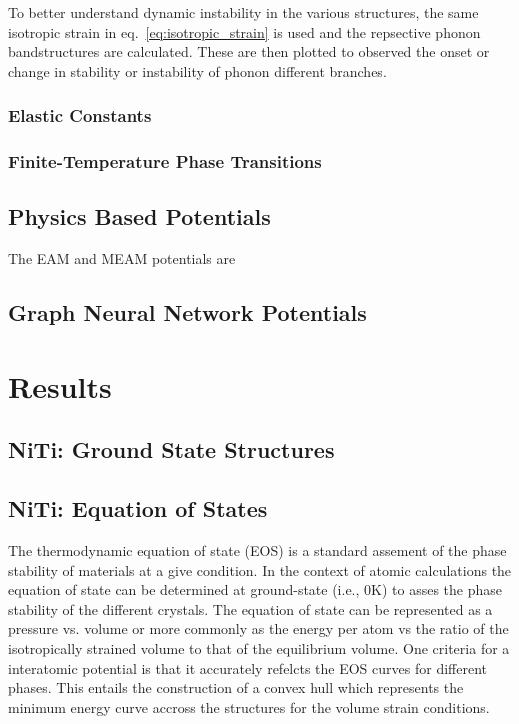 \documentclass[preprint]{elsarticle}
\begin{document}
To better understand dynamic instability in the various structures, the same isotropic strain in eq.~\ref{eq:isotropic_strain} is used and the repsective phonon bandstructures are calculated. These are then plotted to observed the onset or change in stability or instability of phonon different branches. \par

\subsubsection{Elastic Constants}


\subsubsection{Finite-Temperature Phase Transitions}

\subsection{Physics Based Potentials}
\label{sec:physics_potentials}

The EAM and MEAM potentials are 


\subsection{Graph Neural Network Potentials}



\section{Results}
\label{sec:results}

\subsection{NiTi: Ground State Structures}
\label{subsec:nitigs}



\subsection{NiTi: Equation of States}
\label{subsec:nitieos}

The thermodynamic equation of state (EOS) is a standard assement of the phase stability of materials at a give condition. In the context of atomic calculations the equation of state can be determined at ground-state (i.e., 0K) to asses the phase stability of the different crystals. The equation of state can be represented as a pressure vs. volume or more commonly as the energy per atom  vs the ratio of the isotropically strained volume to that of the equilibrium volume. One criteria for a interatomic potential is that it accurately refelcts the EOS curves for different phases. This entails the construction of a convex hull which represents the minimum energy curve accross the structures for the volume strain conditions. \par
\end{document}
